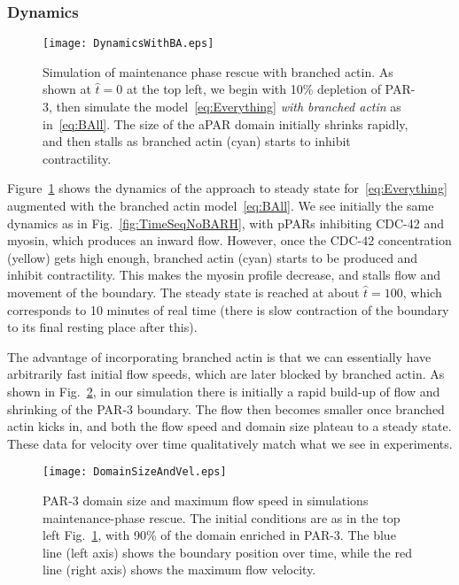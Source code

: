 \documentclass[11pt]{article}
\newcommand{\red}[1]{\color{red}#1\normalcolor}
\newcommand{\6}[1]{#1_{\text{6}}}
\newcommand{\3}[1]{#1_{\text{3}}}
\begin{document}
\subsubsection{Dynamics}
\begin{figure}
\centering
\texttt{[image: DynamicsWithBA.eps]}
\caption{\label{fig:TimeSeqBA} Simulation of maintenance phase rescue with branched actin. As shown at $\hat t=0$ at the top left, we begin with 10\% depletion of PAR-3, then simulate the model\ \eqref{eq:Everything} \emph{with branched actin} as in\ \eqref{eq:BAll}. The size of the aPAR domain initially shrinks rapidly, and then stalls as branched actin (cyan) starts to inhibit contractility.}
\end{figure}

Figure\ \ref{fig:TimeSeqBA} shows the dynamics of the approach to steady state for\ \eqref{eq:Everything} augmented with the branched actin model\ \eqref{eq:BAll}. We see initially the same dynamics as in Fig.\ \ref{fig:TimeSeqNoBARH}, with pPARs inhibiting CDC-42 and myosin, which produces an inward flow. However, once the CDC-42 concentration (yellow) gets high enough, branched actin (cyan) starts to be produced and inhibit contractility. This makes the myosin profile decrease, and stalls flow and movement of the boundary. The steady state is reached at about $\hat t = 100$, which corresponds to 10 minutes of real time (there is slow contraction of the boundary to its final resting place after this). 

The advantage of incorporating branched actin is that we can essentially have arbitrarily fast initial flow speeds, which are later blocked by branched actin. As shown in Fig.\ \ref{fig:VelRescue}, in our simulation there is initially a rapid build-up of flow and shrinking of the PAR-3 boundary. The flow then becomes smaller once branched actin kicks in, and both the flow speed and domain size plateau to a steady state. \red{These data for velocity over time qualitatively match what we see in experiments.}

\begin{figure}
\centering
\texttt{[image: DomainSizeAndVel.eps]}
\caption{\label{fig:VelRescue}PAR-3 domain size and maximum flow speed in simulations maintenance-phase rescue. The initial conditions are as in the top left Fig.\ \ref{fig:TimeSeqBA}, with 90\% of the domain enriched in PAR-3. The blue line (left axis) shows the boundary position over time, while the red line (right axis) shows the maximum flow velocity. }
\end{figure}
\end{document}
